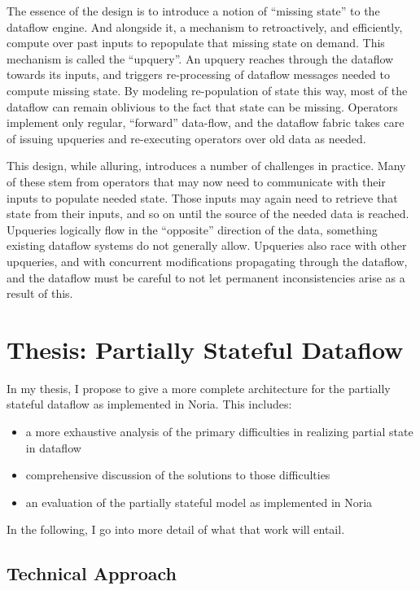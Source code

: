 \documentclass[12pt,letterpaper,twoside]{article}
\begin{document}
The essence of the design is to introduce a notion of ``missing state'' to the
dataflow engine. And alongside it, a mechanism to retroactively, and
efficiently, compute over past inputs to repopulate that missing state on
demand. This mechanism is called the ``upquery''. An upquery reaches through the
dataflow towards its inputs, and triggers re-processing of dataflow messages
needed to compute missing state. By modeling re-population of state this way,
most of the dataflow can remain oblivious to the fact that state can be missing.
Operators implement only regular, ``forward'' data-flow, and the dataflow fabric
takes care of issuing upqueries and re-executing operators over old data as
needed.

This design, while alluring, introduces a number of challenges in practice. Many
of these stem from operators that may now need to communicate with their inputs
to populate needed state. Those inputs may again need to retrieve that state
from their inputs, and so on until the source of the needed data is reached.
Upqueries logically flow in the ``opposite'' direction of the data, something
existing dataflow systems do not generally allow. Upqueries also race with other
upqueries, and with concurrent modifications propagating through the dataflow,
and the dataflow must be careful to not let permanent inconsistencies arise as a
result of this.

\section{Thesis: Partially Stateful Dataflow}

In my thesis, I propose to give a more complete architecture for
the partially stateful dataflow as implemented in Noria. This includes:

\begin{itemize}

 \item a more exhaustive analysis of the primary difficulties in realizing
	 partial state in dataflow
 \item comprehensive discussion of the solutions to those difficulties
 \item an evaluation of the partially stateful model as implemented in Noria
\end{itemize}

In the following, I go into more detail of what that work will entail.

\subsection{Technical Approach}
\end{document}
